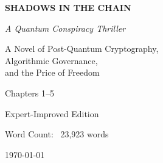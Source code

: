 \documentclass[12pt,letterpaper]{book}
\begin{document}
\begin{titlepage}
    \centering
    \vspace*{2cm}

    {\Huge\bfseries\color{neonblue} SHADOWS IN THE CHAIN\par}
    \vspace{1cm}
    {\Large\itshape A Quantum Conspiracy Thriller\par}
    \vspace{2cm}

    {\large\color{neongreen}
    A Novel of Post-Quantum Cryptography,\\
    Algorithmic Governance,\\
    and the Price of Freedom\\
    \par}

    \vfill

    {\large\color{neonpink} Chapters 1--5\par}
    {\large Expert-Improved Edition\par}
    \vspace{0.5cm}
    {\large Word Count: ~23,923 words\par}

    \vfill

    {\large \today\par}
\end{titlepage}

\tableofcontents
\newpage






\end{document}

